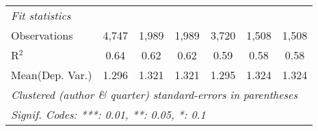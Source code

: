\begin{tabular}{lcccccc}
   \midrule
   \emph{Fit statistics}\\
   Observations            & 4,747   & 1,989   & 1,989   & 3,720       & 1,508   & 1,508\\  
   R$^2$                   & 0.64    & 0.62    & 0.62    & 0.59        & 0.58    & 0.58\\  
Mean(Dep. Var.) & 1.296 & 1.321 & 1.321 & 1.295 & 1.324 & 1.324 \\
   \midrule \midrule
   \multicolumn{7}{l}{\emph{Clustered (author \& quarter) standard-errors in parentheses}}\\
   \multicolumn{7}{l}{\emph{Signif. Codes: ***: 0.01, **: 0.05, *: 0.1}}\\
\end{tabular}
\par\endgroup
